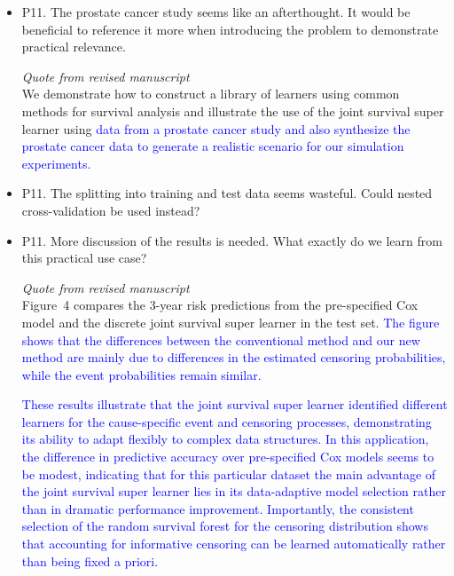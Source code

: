 \documentclass[a4paper,danish]{article}
\newcommand{\1}{\mathds{1}}
\newcommand{\qrev}[2]{
\vspace{.5em}
\begin{tcolorbox}[boxrule=0pt]
\hfill{\it\footnotesize Quote from revised manuscript#1}\\[.5em]
#2
\end{tcolorbox}
}
\newcommand{\answer}[1]{{\vspace{1em}{\bf #1}\vspace{1em}}}
\begin{document}
\begin{itemize}
\item P11. The prostate cancer study seems like an afterthought. It would
be beneficial to reference it more when introducing the problem to
demonstrate practical relevance.

  \answer{
 Great point. We have now added the following sentence to the introduction:
}

\qrev{}{
We demonstrate how to construct
a library of learners using common methods for survival analysis and
illustrate the use of the joint survival super learner using \textcolor{blue}{
data from a prostate cancer study \cite{kattan2000pretreatment} and also
synthesize the prostate cancer data to generate a realistic scenario for our simulation experiments.
}
}

\item P11. The splitting into training and test data seems wasteful. Could
nested cross-validation be used instead?

\answer{There is a trade-off here between the performance of an average
model that can be build with a given sub-sample size of say 90\% of the data,
corresponding to 10-fold cross-validation, and the performance of an actual 
model that was built with a given training sample. Figure 4 of our manuscript
shows the actual predictions of one model in the single-split test sample. If we would switch 
to 10-fold cross-validation then the predicted probabilities would be coming 
from 10 different models. This may as well be of interest but it shows something else
and is in our opinion not generally preferable when the task is to illustrate a new method.

}

\item P11. More discussion of the results is needed. What exactly do we
learn from this practical use case?

  \answer{Good point. We have expanded as follows.}

  \qrev{}{
  Figure~4
  compares the 3-year risk predictions from the pre-specified Cox model
  and the discrete joint survival super learner in the test set.
  \textcolor{blue}{The figure shows that the differences between the conventional method
  and our new method are mainly due to differences in the estimated
  censoring probabilities, while the event probabilities remain similar.
  }

  \textcolor{blue}{
These results illustrate that the joint survival super learner
identified different learners for the cause-specific event and
censoring processes, demonstrating its ability to adapt flexibly to
complex data structures. In this application, the difference in
predictive accuracy over pre-specified Cox models seems to be modest,
indicating that for this particular dataset the main advantage of the
joint survival super learner lies in its data-adaptive model selection
rather than in dramatic performance improvement. Importantly, the
consistent selection of the random survival forest for the censoring
distribution shows that accounting for informative censoring can be
learned automatically rather than being fixed a priori. 
  }
  }


\end{itemize}
\end{document}
